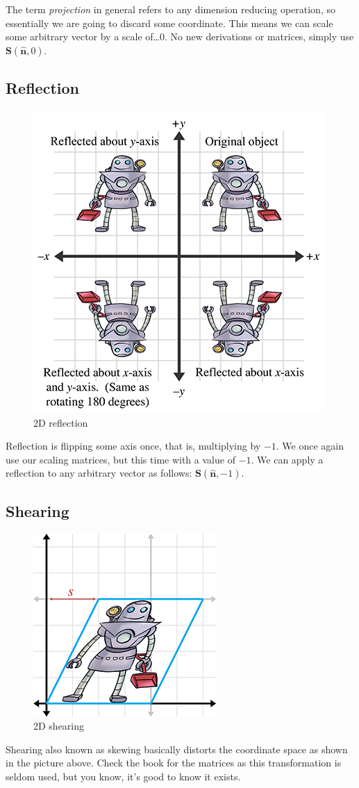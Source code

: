 \documentclass[11pt]{article}
\begin{document}
The term \textit{projection} in general refers to any dimension reducing operation, so essentially we are going to discard some coordinate. This means we can scale some arbitrary vector by a scale of\dots $0$. No new derivations or matrices, simply use $\mathbf{S}(\hat{\mathbf{n}},0)$.

\subsection{Reflection}

\begin{figure}[H]
\centering
    \includegraphics{05_reflection}
\caption{2D reflection}
\label{fig:2d-reflection}
\end{figure}

Reflection is flipping some axis once, that is, multiplying by $-1$. We once again use our scaling matrices, but this time with a value of $-1$. We can apply a reflection to any arbitrary vector as follows: $\mathbf{S}(\hat{\mathbf{n}},-1)$.

\subsection{Shearing}

\begin{figure}[H]
\centering
    \includegraphics{05_shearing}
\caption{2D shearing}
\label{fig:2d-shearing}
\end{figure}

Shearing also known as skewing basically distorts the coordinate space as shown in the picture above. Check the book for the matrices as this transformation is seldom used, but you know, it's good to know it exists.
\end{document}
